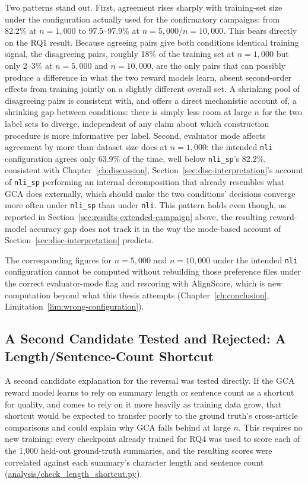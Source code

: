 Two patterns stand out. First, agreement rises sharply with training-set
size under the configuration actually used for the confirmatory campaigns:
from 82.2\% at $n=1{,}000$ to 97.5--97.9\% at $n=5{,}000$/$n=10{,}000$. This
bears directly on the RQ1 result. Because agreeing pairs give both
conditions identical training signal, the disagreeing pairs, roughly 18\%
of the training set at $n=1{,}000$ but only 2--3\% at $n=5{,}000$ and
$n=10{,}000$, are the only pairs that can possibly produce a difference in
what the two reward models learn, absent second-order effects from training
jointly on a slightly different overall set. A shrinking pool of
disagreeing pairs is consistent with, and offers a direct mechanistic
account of, a shrinking gap between conditions: there is simply less room
at large $n$ for the two label sets to diverge, independent of any claim
about which construction procedure is more informative per label. Second,
evaluator mode affects agreement by more than dataset size does at
$n=1{,}000$: the intended \texttt{nli} configuration agrees only 63.9\% of
the time, well below \texttt{nli\_sp}'s 82.2\%, consistent with
Chapter~\ref{ch:discussion}, Section~\ref{sec:disc-interpretation}'s account of \texttt{nli\_sp}
performing an internal decomposition that already resembles what GCA does
externally, which should make the two conditions' decisions converge more
often under \texttt{nli\_sp} than under \texttt{nli}. This pattern holds
even though, as reported in Section~\ref{sec:results-extended-campaign}
above, the resulting reward-model accuracy gap does not track it in the
way the mode-based account of Section~\ref{sec:disc-interpretation}
predicts.

The corresponding figures for $n=5{,}000$ and $n=10{,}000$ under the
intended \texttt{nli} configuration cannot be computed without rebuilding
those preference files under the correct evaluator-mode flag and rescoring
with AlignScore, which is new computation beyond what this thesis attempts
(Chapter~\ref{ch:conclusion}, Limitation~\ref{lim:wrong-configuration}).

\subsection{A Second Candidate Tested and Rejected: A Length/Sentence-Count Shortcut}
\label{sec:results-gt-shortcut}

A second candidate explanation for the reversal was tested directly. If the
GCA reward model learns to rely on summary length or sentence count as a
shortcut for quality, and comes to rely on it more heavily as training data
grow, that shortcut would be expected to transfer poorly to the ground
truth's cross-article comparisons and could explain why GCA falls behind at
large $n$. This requires no new training: every checkpoint already trained
for RQ4 was used to score each of the 1{,}000 held-out ground-truth
summaries, and the resulting scores were correlated against each summary's
character length and sentence count
(\url{analysis/check_length_shortcut.py}).

